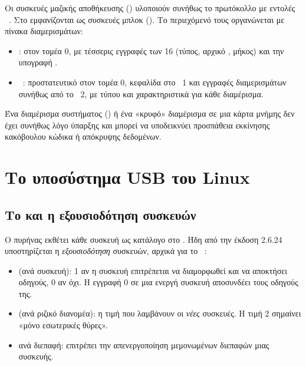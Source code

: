 Οι συσκευές μαζικής αποθήκευσης () υλοποιούν συνήθως το πρωτόκολλο
 με εντολές ~\cite{usbmsc}. Στο 
εμφανίζονται ως συσκευές μπλοκ (). Το περιεχόμενό τους
οργανώνεται με πίνακα διαμερισμάτων:

\begin{itemize}
  \item \textbf{}: στον τομέα 0, με τέσσερις εγγραφές των 16 
        (τύπος, αρχικό , μήκος) και την υπογραφή .
  \item \textbf{}~\cite{uefi210}: προστατευτικό  στον τομέα 0,
        κεφαλίδα στο ~1 και εγγραφές διαμερισμάτων συνήθως από το
        ~2, με  τύπου και χαρακτηριστικά για κάθε διαμέρισμα.
\end{itemize}

Ένα διαμέρισμα συστήματος  () ή ένα «κρυφό» διαμέρισμα σε μια
κάρτα μνήμης δεν έχει συνήθως λόγο ύπαρξης και μπορεί να υποδεικνύει
προσπάθεια εκκίνησης κακόβουλου κώδικα ή απόκρυψης δεδομένων.

\section{Το υποσύστημα USB του Linux}
\label{sec:linux-usb}

\subsection{Το  και η εξουσιοδότηση συσκευών}
\label{sec:authorization}

Ο πυρήνας  εκθέτει κάθε συσκευή  ως κατάλογο στο
. Ήδη από την έκδοση 2.6.24 υποστηρίζεται η
\emph{εξουσιοδότηση} συσκευών, αρχικά για το ~\cite{kernel-usb-authorization}:

\begin{itemize}
  \item {} (ανά συσκευή): 1 αν η συσκευή επιτρέπεται να
        διαμορφωθεί και να αποκτήσει οδηγούς, 0 αν όχι. Η εγγραφή 0 σε μια
        ενεργή συσκευή αποσυνδέει τους οδηγούς της.
  \item {} (ανά ριζικό διανομέα): η τιμή
         που λαμβάνουν οι \emph{νέες} συσκευές. Η τιμή 2
        σημαίνει «μόνο εσωτερικές θύρες».
  \item {} ανά διεπαφή: επιτρέπει την απενεργοποίηση μεμονωμένων
        διεπαφών μιας συσκευής.
\end{itemize}

